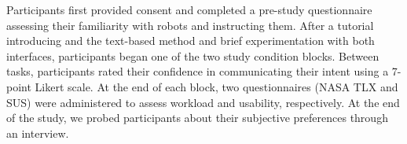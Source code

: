  Participants first provided consent and completed a pre-study questionnaire assessing their familiarity with robots and instructing them. After a tutorial introducing \projname and the text-based method and brief experimentation with both interfaces, participants began one of the two study condition blocks. Between tasks, participants rated their confidence in communicating their intent using a 7-point Likert scale. At the end of each block, two questionnaires (NASA TLX and SUS) were administered to assess workload and usability, respectively. At the end of the study, we probed participants about their subjective preferences through an interview.